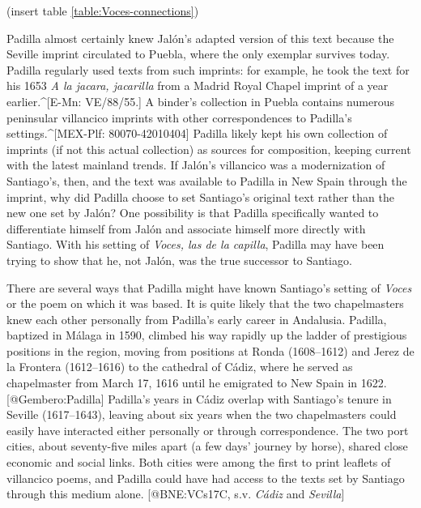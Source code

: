 (insert table \ref{table:Voces-connections})
\label{table:Voces-connections}

Padilla almost certainly knew Jalón's adapted version of this text because the
Seville imprint circulated to Puebla, where the only exemplar survives today.
Padilla regularly used texts from such imprints: for example, he took
the text for his 1653 \emph{A la jacara, jacarilla} from a Madrid Royal Chapel
imprint of a year earlier.^[E-Mn: VE/88/55.]
A binder's collection in Puebla contains numerous peninsular villancico imprints
with other correspondences to Padilla's settings.^[MEX-Plf: 80070-42010404]
Padilla likely kept his own collection of imprints (if not this actual
collection) as sources for composition, keeping current with the latest mainland
trends.
If Jalón's villancico was a modernization of Santiago's, then, and the text was
available to Padilla in New Spain through the imprint, why did Padilla choose to
set Santiago's original text rather than the new one set by Jalón?
One possibility is that Padilla specifically wanted to differentiate himself
from Jalón and associate himself more directly with Santiago.
With his setting of \emph{Voces, las de la capilla}, Padilla may have been trying to
show that he, not Jalón, was the true successor to Santiago.

There are several ways that Padilla might have known Santiago's setting of
\emph{Voces} or the poem on which it was based.
It is quite likely that the two chapelmasters knew each other personally from
Padilla's early career in Andalusia.
Padilla, baptized in Málaga in 1590, climbed his way rapidly up the ladder of
prestigious positions in the region, moving from positions at Ronda (1608--1612)
and Jerez de la Frontera (1612--1616) to the cathedral of Cádiz, where he served
as chapelmaster from March 17, 1616 until he emigrated to New Spain in 1622.
[@Gembero:Padilla]
Padilla's years in Cádiz overlap with Santiago's tenure in Seville (1617--1643),
leaving about six years when the two chapelmasters could easily have interacted
either personally or through correspondence.
The two port cities, about seventy-five miles apart (a few days' journey by
horse), shared close economic and social links.
Both cities were among the first to print leaflets of villancico poems, and
Padilla could have had access to the texts set by Santiago through this medium
alone.
[@BNE:VCs17C, s.v. \emph{Cádiz} and \emph{Sevilla}]

